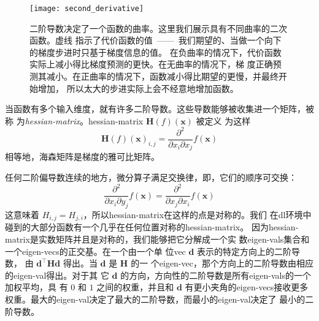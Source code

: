 \begin{figure}[h]
  \centering
  \texttt{[image: second\_derivative]}
  \caption{二阶导数决定了一个函数的曲率。这里我们展示具有不同曲率的二次函数。虚线
    指示了代价函数的值~——~我们期望的、当做一个向下的梯度步进时只基于梯度信息的值。
    在负曲率的情况下，代价函数实际上减小得比梯度预测的更快。在无曲率的情况下，梯
    度正确预测其减小。在正曲率的情况下，函数减小得比期望的更慢，并最终开始增加，
    所以太大的步进实际上会不经意地增加函数。\label{fig:second_derivative}}
\end{figure}

当函数有多个输入维度，就有许多二阶导数。这些导数能够被收集进一个矩阵，被称
为\emph{\gls{hessian-matrix}}。\gls*{hessian-matrix} $\pmb{H}(f)(\pmb{x})$ 被定义
为这样
\begin{equation}
  \pmb{H}(f)(\pmb{x})_{i,j} = \frac{\partial^2}{\partial x_i \partial x_j}f(\pmb{x})
\end{equation}
相等地，海森矩阵是梯度的雅可比矩阵。

任何二阶偏导数连续的地方，微分算子满足交换律，即，它们的顺序可交换：
\begin{equation}
  \frac{\partial^2}{\partial x_i \partial y_j}f(\pmb{x}) = \frac{\partial^2}{\partial x_j \partial x_i}f(\pmb{x})
\end{equation}
这意味着
$H_{i,j} = H_{j,i}$，所以\gls*{hessian-matrix}在这样的点是对称的。我们
在\gls*{dl}环境中碰到的大部分函数有一个几乎在任何位置对称的\gls*{hessian-matrix}。
因为\gls*{hessian-matrix}是实数矩阵并且是对称的，我们能够把它分解成一个实
数\gls*{eigen-vals}集合和一个\gls*{eigen-vecs}的正交基。在一个由一个单
位\gls*{vec} $\pmb{d}$ 表示的特定方向上的二阶导数，
由 $\pmb{d}^{\top}\pmb{H}\pmb{d}$ 得出。当 $\pmb{d}$ 是 $\pmb{H}$ 的一
个\gls*{eigen-vec}，那个方向上的二阶导数由相应的\gls*{eigen-val}得出。对于其
它 $\pmb{d}$ 的方向，方向性的二阶导数是所有\gls*{eigen-vals}的一个加权平均，具
有 $0$ 和 $1$ 之间的权重，并且和 $\pmb{d}$ 有更小夹角的\gls*{eigen-vecs}接收更多
权重。最大的\gls*{eigen-val}决定了最大的二阶导数，而最小的\gls*{eigen-val}决定了
最小的二阶导数。

